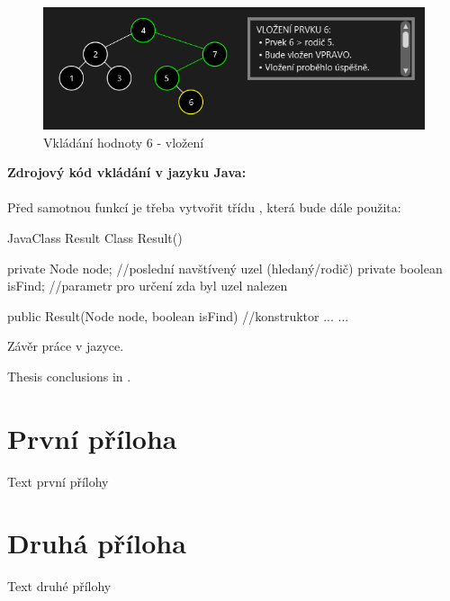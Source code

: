 \documentclass[
  biblatex=false,
  font=serif,
  glossaries=false,
  tables=false,
  theorems=false,
  index
]{kidiplom}
\begin{document}
\begin{figure}[h!]
\centering
	\includegraphics[scale=0.9]{obrazky/6BinarniVkladani2.png}
	\caption{Vkládání hodnoty 6 - vložení}
	\label{binaryInsert}
\end{figure}

\newpage
\noindent \textbf{Zdrojový kód vkládání v jazyku Java:}\\\\
\noindent Před samotnou funkcí  je třeba vytvořit třídu , která bude dále použita:
\begin{kicode}{Java}{Class Result}
Class Result() {
	private Node node; //poslední navštívený uzel (hledaný/rodič)
	private boolean isFind; //parametr pro určení zda byl uzel nalezen
	
	public Result(Node node, boolean isFind) { //konstruktor
		...
	}	
	...
}
\end{kicode}




\begin{kiconclusions}
Závěr práce v  jazyce.
\end{kiconclusions}

\begin{kiconclusions}[english]
Thesis conclusions in .
\end{kiconclusions}

\appendix

\section{První příloha}
Text první přílohy

\section{Druhá příloha}
Text druhé přílohy
\end{document}
